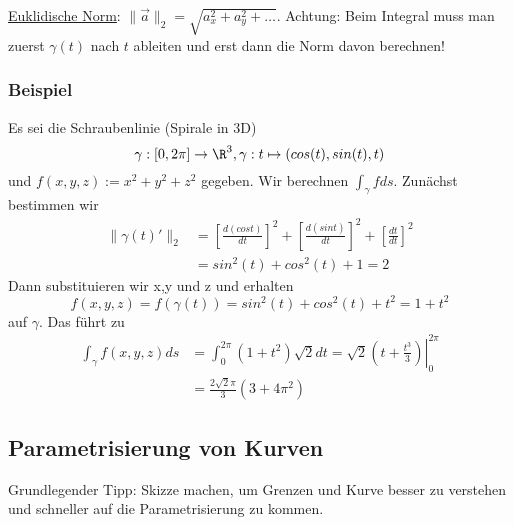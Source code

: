 \underline{Euklidische Norm}: $\|\vec{a}\|_2 = \sqrt{a_x^2 + a_y^2 + \ldots}$.
Achtung: Beim Integral muss man zuerst $\gamma(t)$ nach $t$ ableiten und erst
dann die Norm davon berechnen!

\subsubsection{Beispiel}
Es sei die Schraubenlinie (Spirale in 3D)
\[
\gamma : [0,2\pi]  \to \R^3, \gamma : t \mapsto  (cos(t), sin(t), t) 
\]
und $f(x,y,z) := x^2 + y^2 + z^2$ gegeben. Wir berechnen $\int_\gamma f ds$. Zunächst bestimmen wir
\begin{align*}
\|\gamma(t)'\|_2 &= \left[\frac{d(cos t)}{dt}\right]^2 + \left[\frac{d(sin t)}{dt}\right]^2 + \left[\frac{dt}{dt}\right]^2 \\
&=  sin^2(t)+cos^2(t)+1=2
\end{align*}
Dann substituieren wir x,y und z und erhalten
\[
f(x,y,z) = f(\gamma(t)) = sin^2(t)+cos^2(t)+t^2 = 1 +t^2
\]
auf $\gamma$. Das führt zu
\begin{align*}
\int_\gamma f(x,y,z) ds &= \int_0^{2\pi} (1 +t^2)\sqrt{2} dt = \left. \sqrt{2}(t+\frac{t^3}{3}) \right|_0^{2\pi} \\
&= \frac{2\sqrt{2}\pi}{3}(3+4\pi^2)
\end{align*}


\subsection{Parametrisierung von Kurven}
Grundlegender Tipp: Skizze machen, um Grenzen und Kurve besser zu verstehen und
schneller auf die Parametrisierung zu kommen.


